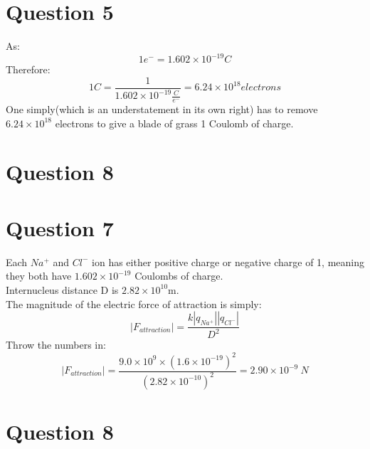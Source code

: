 \documentclass[12pt]{article}
\begin{document}
\begin{itemize}
\section{Question 5}
As:
\begin{displaymath}
1 e^{-} = 1.602 \times 10^{-19} C
\end{displaymath}
Therefore:
\begin{displaymath}
1 C = \frac{1}{1.602 \times 10^{-19} \frac{C}{e^{-}}}= 6.24 \times 10^{18} electrons
\end{displaymath}
One simply(which is an understatement in its own right) has to remove $6.24 \times 10^{18}$ electrons to give a blade of grass 1 Coulomb of charge. 

\pagebreak
\section{Question 8}
\pagebreak
\section{Question 7}
Each $Na^+$ and $Cl^{-}$ ion has either positive charge or negative charge of 1, meaning they both have
$1.602\times10^{-19}$ Coulombs of charge. \\ 
Internucleus distance D is $2.82 \times 10^{10}$m. \\
The magnitude of the electric force of attraction is simply:
\begin{displaymath}
|F_{attraction}|=\frac{k|q_{Na^+}||q_{Cl^-}|}{D^2}
\end{displaymath}
Throw the numbers in:
\begin{displaymath}
|F_{attraction}|=\frac{9.0 \times 10^9 \times(1.6 \times 10^{-19})^2 }{(2.82 \times 10^{-10})^2}=2.90\times 10^{-9} \ N 
\end{displaymath}

\pagebreak
\section{Question 8}

\end{itemize}
\end{document}
